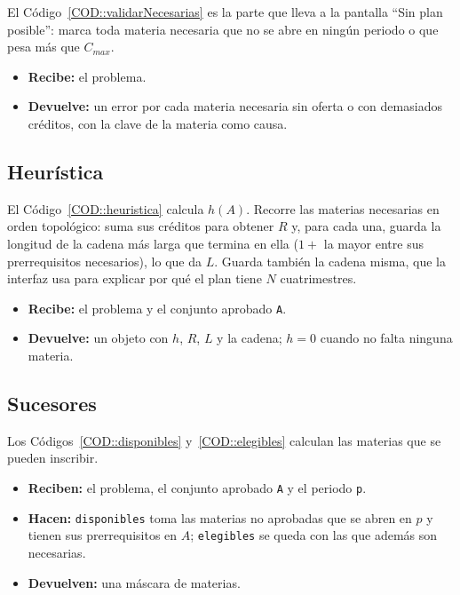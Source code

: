El Código~\ref{COD::validarNecesarias} es la parte que lleva a la pantalla ``Sin plan posible'': marca toda materia necesaria que no se abre en ningún periodo o que pesa más que $C_{max}$.
\begin{itemize}
    \item \textbf{Recibe:} el problema.
    \item \textbf{Devuelve:} un error por cada materia necesaria sin oferta o con demasiados créditos, con la clave de la materia como causa.
\end{itemize}


\subsection{Heurística}
El Código~\ref{COD::heuristica} calcula $h(A)$. Recorre las materias necesarias en orden topológico: suma sus créditos para obtener $R$ y, para cada una, guarda la longitud de la cadena más larga que termina en ella ($1 +$ la mayor entre sus prerrequisitos necesarios), lo que da $L$. Guarda también la cadena misma, que la interfaz usa para explicar por qué el plan tiene $N$ cuatrimestres.
\begin{itemize}
    \item \textbf{Recibe:} el problema y el conjunto aprobado \texttt{A}.
    \item \textbf{Devuelve:} un objeto con $h$, $R$, $L$ y la cadena; $h = 0$ cuando no falta ninguna materia.
\end{itemize}


\subsection{Sucesores}
Los Códigos~\ref{COD::disponibles} y~\ref{COD::elegibles} calculan las materias que se pueden inscribir.
\begin{itemize}
    \item \textbf{Reciben:} el problema, el conjunto aprobado \texttt{A} y el periodo \texttt{p}.
    \item \textbf{Hacen:} \texttt{disponibles} toma las materias no aprobadas que se abren en $p$ y tienen sus prerrequisitos en $A$; \texttt{elegibles} se queda con las que además son necesarias.
    \item \textbf{Devuelven:} una máscara de materias.
\end{itemize}



